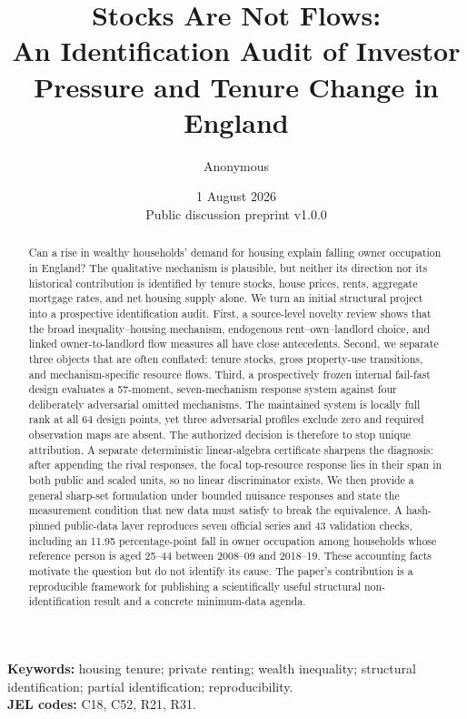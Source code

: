 \documentclass[11pt]{article}
\title{\textbf{Stocks Are Not Flows:}\\
An Identification Audit of Investor Pressure and Tenure Change in England}
\author{Anonymous}
\date{1 August 2026\\Public discussion preprint v1.0.0}
\begin{document}
\maketitle

\begin{abstract}
Can a rise in wealthy households' demand for housing explain falling owner
occupation in England? The qualitative mechanism is plausible, but neither its
direction nor its historical contribution is identified by tenure stocks, house
prices, rents, aggregate mortgage rates, and net housing supply alone. We turn an
initial structural project into a prospective identification audit. First, a
source-level novelty review shows that the broad inequality--housing mechanism,
endogenous rent--own--landlord choice, and linked owner-to-landlord flow measures
all have close antecedents. Second, we separate three objects that are often
conflated: tenure stocks, gross property-use transitions, and mechanism-specific
resource flows. Third, a prospectively frozen internal fail-fast design evaluates a 57-moment,
seven-mechanism response system against four deliberately adversarial omitted
mechanisms. The maintained system is locally full rank at all 64 design points,
yet three adversarial profiles exclude zero and required observation maps are
absent. The authorized decision is therefore to stop unique attribution. A
separate deterministic linear-algebra certificate sharpens the diagnosis: after appending
the rival responses, the focal top-resource response lies in their span in both
public and scaled units, so no linear discriminator exists. We then provide a
general sharp-set formulation under bounded nuisance responses and state the
measurement condition that new data must satisfy to break the equivalence. A
hash-pinned public-data layer reproduces seven official series and 43 validation
checks, including an 11.95 percentage-point fall in owner occupation among
households whose reference person is aged 25--44 between 2008--09 and 2018--19.
These accounting facts motivate the question but do not identify its cause. The
paper's contribution is a reproducible framework for publishing a scientifically
useful structural non-identification result and a concrete minimum-data agenda.
\end{abstract}

\noindent\textbf{Keywords:} housing tenure; private renting; wealth inequality;
structural identification; partial identification; reproducibility.\\
\textbf{JEL codes:} C18, C52, R21, R31.
\end{document}
